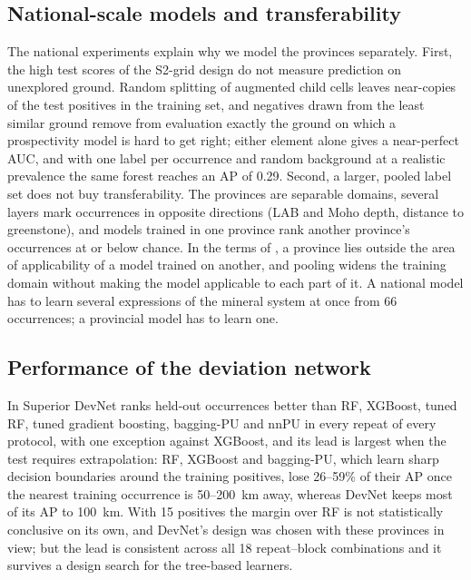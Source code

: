 \documentclass[pdflatex,sn-apa]{sn-jnl}
\begin{document}
\subsection{National-scale models and transferability}\label{sec:disc-scale}

The national experiments explain why we model the provinces separately. First, the high test scores of the S2-grid design do not measure prediction on unexplored ground. Random splitting of augmented child cells leaves near-copies of the test positives in the training set, and negatives drawn from the least similar ground remove from evaluation exactly the ground on which a prospectivity model is hard to get right; either element alone gives a near-perfect AUC, and with one label per occurrence and random background at a realistic prevalence the same forest reaches an AP of 0.29. Second, a larger, pooled label set does not buy transferability. The provinces are separable domains, several layers mark occurrences in opposite directions (LAB and Moho depth, distance to greenstone), and models trained in one province rank another province's occurrences at or below chance. In the terms of \citet{Meyer2021}, a province lies outside the area of applicability of a model trained on another, and pooling widens the training domain without making the model applicable to each part of it. A national model has to learn several expressions of the mineral system at once from 66 occurrences; a provincial model has to learn one.

\subsection{Performance of the deviation network}\label{sec:disc-devnet}

In Superior DevNet ranks held-out occurrences better than RF, XGBoost, tuned RF, tuned gradient boosting, bagging-PU and nnPU in every repeat of every protocol, with one exception against XGBoost, and its lead is largest when the test requires extrapolation: RF, XGBoost and bagging-PU, which learn sharp decision boundaries around the training positives, lose 26--59\% of their AP once the nearest training occurrence is 50--200~km away, whereas DevNet keeps most of its AP to 100~km. With 15 positives the margin over RF is not statistically conclusive on its own, and DevNet's design was chosen with these provinces in view; but the lead is consistent across all 18 repeat--block combinations and it survives a design search for the tree-based learners.
\end{document}
